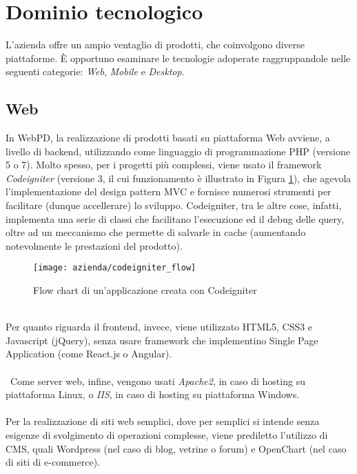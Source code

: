 \section{Dominio tecnologico}
L'azienda offre un ampio ventaglio di prodotti, che coinvolgono diverse piattaforme. È opportuno esaminare le tecnologie adoperate raggruppandole nelle seguenti categorie: \textit{Web}, \textit{Mobile} e \textit{Desktop}.

\subsection{Web}
In WebPD, la realizzazione di prodotti basati su piattaforma Web avviene, a livello di backend, utilizzando come linguaggio di programmazione PHP (versione 5 o 7). Molto spesso, per i progetti più complessi, viene usato il framework \textit{Codeigniter} (versione 3, il cui funzionamento è illustrato in Figura \ref{figura:flow-chart-codeigniter}), che agevola l'implementazione del design pattern MVC e fornisce numerosi strumenti per facilitare (dunque accellerare) lo sviluppo. Codeigniter, tra le altre cose, infatti, implementa una serie di classi che facilitano l'esecuzione ed il debug delle query, oltre ad un meccanismo che permette di salvarle in cache (aumentando notevolmente le prestazioni del prodotto).\\
\begin{figure}[!h] 
	\centering 
	\texttt{[image: azienda/codeigniter\_flow]} 
	\caption{Flow chart di un'applicazione creata con Codeigniter}
	\label{figura:flow-chart-codeigniter}
\end{figure}\\
Per quanto riguarda il frontend, invece, viene utilizzato HTML5, CSS3 e Javascript (jQuery), senza usare framework che implementino Single Page Application (come React.js o Angular).\\\\\
Come server web, infine, vengono usati \textit{Apache2}, in caso di hosting su piattaforma Linux, o  \textit{IIS}, in caso di hosting su piattaforma Windows.\\\\
Per la realizzazione di siti web semplici, dove per semplici si intende senza esigenze di svolgimento di operazioni complesse, viene prediletto l'utilizzo di CMS, quali Wordpress (nel caso di blog, vetrine o forum) e OpenChart (nel caso di siti di e-commerce).
\\
\\
